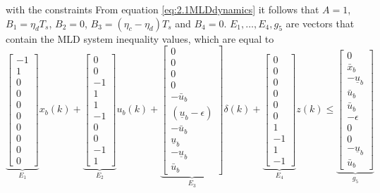with the constraints
From equation \ref{eq:2.1MLDdynamics} it follows that $A = 1$, $B_1 = \eta_dT_s$, $B_2 = 0$, $B_3 = (\eta_c - \eta_d)T_s$ and $B_4 = 0$. $E_1,\dots,E_4,g_5$ are vectors that contain the MLD system inequality values, which are equal to
$$
\underbrace{\begin{bmatrix} -1 \\ 1 \\ 0 \\ 0 \\ 0 \\ 0 \\ 0 \\ 0 \\ 0 \\ 0 \end{bmatrix}}_{E_1}x_b(k) + 
\underbrace{\begin{bmatrix} 0 \\ 0 \\ -1 \\ 1 \\ 1 \\ -1 \\ 0 \\ 0 \\ -1 \\ 1 \end{bmatrix}}_{E_2}u_b(k) + 
\underbrace{\begin{bmatrix} 0 \\ 0 \\ 0 \\ 0 \\ -\bar{u}_b \\ (\underline{u}_b-\epsilon) \\ -\bar{u}_b \\ \underline{u}_b \\ -\underline{u}_b \\ \bar{u}_b \end{bmatrix}}_{E_3}\delta(k) +
\underbrace{\begin{bmatrix} 0 \\ 0 \\ 0 \\ 0 \\ 0 \\ 0 \\ 1 \\ -1 \\ 1 \\ -1 \end{bmatrix}}_{E_4}z(k) \leq
\underbrace{\begin{bmatrix} 0 \\ \bar{x}_b \\ -\underline{u}_b \\ \bar{u}_b \\ \bar{u}_b \\ -\epsilon \\ 0 \\ 0 \\ -\underline{u}_b \\ \bar{u}_b \end{bmatrix}}_{g_5}
$$